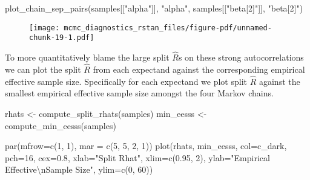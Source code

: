 \documentclass[
  letterpaper,
  DIV=11,
  numbers=noendperiod]{scrartcl}
\newenvironment{Shaded}{\begin{snugshade}}{\end{snugshade}}
\newcommand{\AttributeTok}[1]{\textcolor[rgb]{0.40,0.45,0.13}{#1}}
\newcommand{\DecValTok}[1]{\textcolor[rgb]{0.68,0.00,0.00}{#1}}
\newcommand{\FloatTok}[1]{\textcolor[rgb]{0.68,0.00,0.00}{#1}}
\newcommand{\FunctionTok}[1]{\textcolor[rgb]{0.28,0.35,0.67}{#1}}
\newcommand{\NormalTok}[1]{\textcolor[rgb]{0.00,0.23,0.31}{#1}}
\newcommand{\OtherTok}[1]{\textcolor[rgb]{0.00,0.23,0.31}{#1}}
\newcommand{\SpecialCharTok}[1]{\textcolor[rgb]{0.37,0.37,0.37}{#1}}
\newcommand{\StringTok}[1]{\textcolor[rgb]{0.13,0.47,0.30}{#1}}
\begin{document}
\begin{Shaded}
\begin{Highlighting}[]
\FunctionTok{plot\_chain\_sep\_pairs}\NormalTok{(samples[[}\StringTok{"alpha"}\NormalTok{]], }\StringTok{"alpha"}\NormalTok{, }
\NormalTok{                     samples[[}\StringTok{"beta[2]"}\NormalTok{]], }\StringTok{"beta[2]"}\NormalTok{)}
\end{Highlighting}
\end{Shaded}

\begin{figure}[H]

{\centering \texttt{[image: mcmc\_diagnostics\_rstan\_files/figure-pdf/unnamed-chunk-19-1.pdf]}

}

\end{figure}

To more quantitatively blame the large split \(\hat{R}\)s on these
strong autocorrelations we can plot the split \(\hat{R}\) from each
expectand against the corresponding empirical effective sample size.
Specifically for each expectand we plot split \(\hat{R}\) against the
smallest empirical effective sample size amongst the four Markov chains.

\begin{Shaded}
\begin{Highlighting}[]
\NormalTok{rhats }\OtherTok{\textless{}{-}} \FunctionTok{compute\_split\_rhats}\NormalTok{(samples)}
\NormalTok{min\_eesss }\OtherTok{\textless{}{-}} \FunctionTok{compute\_min\_eesss}\NormalTok{(samples)}

\FunctionTok{par}\NormalTok{(}\AttributeTok{mfrow=}\FunctionTok{c}\NormalTok{(}\DecValTok{1}\NormalTok{, }\DecValTok{1}\NormalTok{), }\AttributeTok{mar =} \FunctionTok{c}\NormalTok{(}\DecValTok{5}\NormalTok{, }\DecValTok{5}\NormalTok{, }\DecValTok{2}\NormalTok{, }\DecValTok{1}\NormalTok{))}
\FunctionTok{plot}\NormalTok{(rhats, min\_eesss,}
     \AttributeTok{col=}\NormalTok{c\_dark, }\AttributeTok{pch=}\DecValTok{16}\NormalTok{, }\AttributeTok{cex=}\FloatTok{0.8}\NormalTok{,}
     \AttributeTok{xlab=}\StringTok{"Split Rhat"}\NormalTok{, }\AttributeTok{xlim=}\FunctionTok{c}\NormalTok{(}\FloatTok{0.95}\NormalTok{, }\DecValTok{2}\NormalTok{),}
     \AttributeTok{ylab=}\StringTok{"Empirical Effective}\SpecialCharTok{\textbackslash{}n}\StringTok{Sample Size"}\NormalTok{, }\AttributeTok{ylim=}\FunctionTok{c}\NormalTok{(}\DecValTok{0}\NormalTok{, }\DecValTok{60}\NormalTok{))}
\end{Highlighting}
\end{Shaded}
\end{document}

